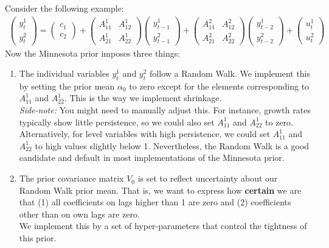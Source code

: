 \begin{enumerate}
Consider the following example:
\begin{align*}
\begin{pmatrix} y_t^1\\y_t^2 \end{pmatrix}
=
\begin{pmatrix} c_1\\c_2 \end{pmatrix}
+
\begin{pmatrix} A_{11}^1 & A_{12}^1\\A_{21}^1 & A_{22}^1 \end{pmatrix}
\begin{pmatrix} y_{t-1}^1\\y_{t-1}^2 \end{pmatrix}
+
\begin{pmatrix} A_{11}^2 & A_{12}^2\\A_{21}^2 & A_{22}^2 \end{pmatrix}
\begin{pmatrix} y_{t-2}^1\\y_{t-2}^2 \end{pmatrix}
+
\begin{pmatrix} u_t^1\\u_t^2 \end{pmatrix}
\end{align*}
Now the Minnesota prior imposes three things:
\begin{enumerate}
\item The individual variables \(y_t^1\) and \(y_t^2\) follow a Random Walk.
We implement this by setting the prior mean \(\alpha_0\) to zero
  except for the elements corresponding to \(A_{11}^1\) and \(A_{22}^1\).
This is the way we implement shrinkage.
\\
\emph{Side-note:} You might need to manually adjust this.
For instance, growth rates typically show little persistence, so we could also set \(A_{11}^1\) and \(A_{22}^1\) to zero.
Alternatively, for level variables with high persistence, we could set \(A_{11}^1\) and \(A_{22}^1\) to high values slightly below 1.
Nevertheless, the Random Walk is a good candidate
  and default in most implementations of the Minnesota prior.
\item The prior covariance matrix \(V_0\) is set to reflect uncertainty about our Random Walk prior mean.
That is, we want to express how \textbf{certain} we are that
(1) all coefficients on lags higher than 1 are zero and 
(2) coefficients other than on own lags are zero.
\\
We implement this by a set of hyper-parameters that control the tightness of this prior.

\end{enumerate}
\end{enumerate}
